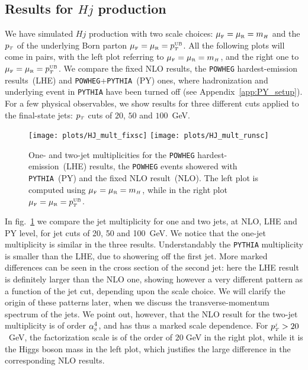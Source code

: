 \documentclass[paper]{JHEP3}
\newlength{\hfig}
\newcommand\PYTHIA{{\tt PYTHIA}}
\newcommand\muf{\mu_{\sss\rm F}}
\newcommand\mur{\mu_{\sss\rm R}}
\newcommand\mH{m_{\sss  H}}
\newcommand\sss{\mathchoice%
{\displaystyle}%
{\scriptstyle}%
{\scriptscriptstyle}%
{\scriptscriptstyle}%
}
\newcommand\as{\alpha_{\sss\rm S}}
\newcommand\pt{p_{\sss T}}
\newcommand\pT{p_{\sss T}}
\newcommand\POWHEG{{\tt POWHEG}}
\begin{document}
\subsection{Results for $Hj$ production}
We have simulated $Hj$ production with two scale choices: $\muf=\mur=\mH$ and
the $\pt$ of the underlying Born parton $\muf=\mur=\pt^{\sss\rm UB}$.
All the following plots will come in pairs, with the left plot referring to
$\muf=\mur=\mH$, and the right one to $\muf=\mur=\pt^{\sss\rm UB}$.
We
compare the fixed NLO results, the \POWHEG{} hardest-emission results~(LHE) and
\POWHEG{}+\PYTHIA{}~(PY) ones, where hadronization and underlying event in
\PYTHIA{} have been turned off (see Appendix~\ref{app:PY_setup}).  For a few
physical observables, we show results for three different cuts applied to the
final-state jets: $\pt$ cuts of $20$, $50$ and $100$~GeV.  

\begin{figure}[htb]
\begin{center}
\texttt{[image: plots/HJ\_mult\_fixsc]} 
\texttt{[image: plots/HJ\_mult\_runsc]} 
\caption{One- and two-jet multiplicities for the \POWHEG{}
  hardest-emission~(LHE) results, the \POWHEG{} events showered with
  \PYTHIA{}~(PY) and the fixed NLO result~(NLO).  The left plot is computed
  using $\muf=\mur=\mH$, while in the right plot $\muf=\mur=\pt^{\sss\rm
    UB}$.}
\label{fig:HJ_mult}
\end{center}
\end{figure}
In fig.~\ref{fig:HJ_mult} we compare the jet multiplicity for one and
two jets, at NLO, LHE and PY level, for jet cuts of 20, 50 and 100~GeV. We
notice that the one-jet multiplicity is similar in the three results. Understandably 
the \PYTHIA{} multiplicity is smaller than the LHE, due to showering
off the first jet.  More marked differences can be seen in the cross
section of the second jet: here the LHE result is definitely larger than the
NLO one, showing however a very different pattern as a function of the jet
cut, depending upon the scale choice. We will clarify the origin of these
patterns later, when we discuss the transverse-momentum spectrum of the jets.
We point out, however, that the NLO result for the two-jet multiplicity
is of order $\as^4$, and has thus a marked scale dependence. For
$\pT^{\sss j}>20$~GeV, the factorization scale is of the order of $20\;$GeV in the
right plot, while it is the Higgs boson mass in the left plot, which justifies the
large difference in the corresponding NLO results.
\end{document}
